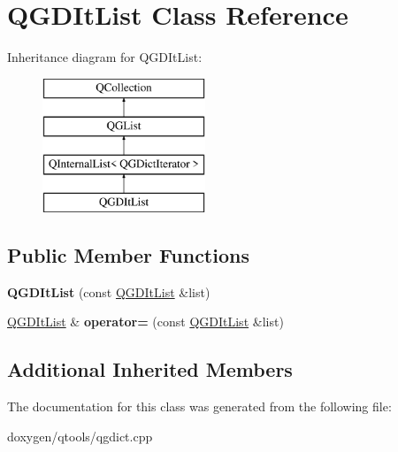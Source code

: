 \hypertarget{class_q_g_d_it_list}{}\section{Q\+G\+D\+It\+List Class Reference}
\label{class_q_g_d_it_list}
Inheritance diagram for Q\+G\+D\+It\+List\+:\begin{figure}[H]
\begin{center}
\leavevmode
\includegraphics[height=4.000000cm]{class_q_g_d_it_list}
\end{center}
\end{figure}
\subsection*{Public Member Functions}
\begin{DoxyCompactItemize}
\item 
\mbox{\label{class_q_g_d_it_list_acb96f4ba285cb3d8a4fb676955741c45}} 
{\bfseries Q\+G\+D\+It\+List} (const \mbox{\hyperlink{class_q_g_d_it_list}{Q\+G\+D\+It\+List}} \&list)
\item 
\mbox{\label{class_q_g_d_it_list_a0a0e94a90fd999bf556a3743962e5c6f}} 
\mbox{\hyperlink{class_q_g_d_it_list}{Q\+G\+D\+It\+List}} \& {\bfseries operator=} (const \mbox{\hyperlink{class_q_g_d_it_list}{Q\+G\+D\+It\+List}} \&list)
\end{DoxyCompactItemize}
\subsection*{Additional Inherited Members}


The documentation for this class was generated from the following file\+:\begin{DoxyCompactItemize}
\item 
doxygen/qtools/qgdict.\+cpp\end{DoxyCompactItemize}

